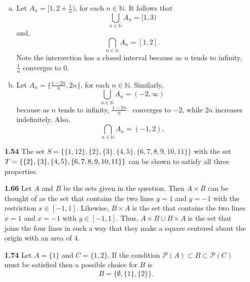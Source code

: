 \documentclass[12pt]{article}
\newcommand{\pow}[1]{ \mathcal{P}\left(#1\right) }
\begin{document}
\begin{itemize}
        \begin{enumerate}[(a)]
            \item Let $A_n=[1,2+\frac{1}{n})$, for each $n\in \mathbb{N}$. It follows that
                \begin{equation*}
                    \bigcup_{n\in \mathbb{N}}A_n=[1,3)
                \end{equation*}
            and,
            \begin{equation*}
                    \bigcap_{n\in \mathbb{N}}A_n=[1,2].
                \end{equation*}
            Note the intersection has a closed interval because as $n$ tends to infinity, $\frac{1}{n}$ converges to 0. 
            \item Let $A_n=\{\frac{1-2n}{n},2n\}$, for each $n \in \mathbb{N}$. Similarly,
                \begin{equation*}
                    \bigcup_{n\in \mathbb{N}}A_n=(-2, \infty)
                \end{equation*}
            because as $n$ tends to infinity, $\frac{1-2n}{n}$ \ converges to $-2$, while $2n$ increases indefinitely. Also,
            \begin{equation*}
                    \bigcap_{n\in \mathbb{N}}A_n=(-1,2).
                \end{equation*}
        \end{enumerate}
        
    \item[\bf{1.54}] The set $S=\{\{1,12\},\{2\},\{3\},\{4,5\}, \{6,7,8,9,10,11\}\}$ with the set $T=\{\{2\},\{3\},\{4,5\},\\ \{6,7,8,9,10,11\}\}$ can be shown to satisfy all three properties.

    \item[\bf{1.66}] Let $A$ and $B$ be the sets given in the question. Then $A\times B$ can be thought of as the set that contains the two lines $y=1$ and $y=-1$ with the restriction $x\in [-1,1]$. Likewise, $B\times A$ is the set that contains the two lines $x=1$ and $x=-1$ with $y\in [-1,1]$. Thus, $A\times B \cup B\times A$ is the set that joins the four lines in such a way that they make a square centered about the origin with an area of $4$. 
      
    \item[\bf{1.74}] Let $A = \{1\}$ and $C=\{1,2\}$. If the condition $\pow{A}\subset B\subset \pow{C}$ must be satisfied then a possible choice for $B$ is 
        \begin{equation*}
            B=\{\emptyset,\{1\}, \{2\}\}.
        \end{equation*}
        

\end{itemize}
\end{document}
